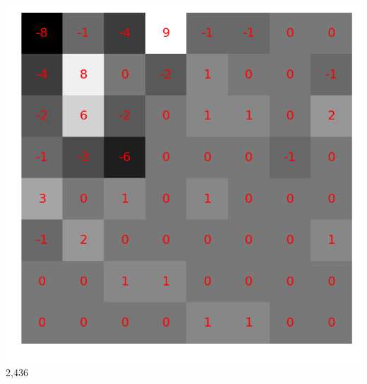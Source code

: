 \documentclass{beamer}
\begin{document}
\begin{frame}
\begin{minipage}[t]{0.42\linewidth}
\begin{center}
            \includegraphics[scale=0.2]{fig/8x8random_dct_entropy2.png}\\
            2,436
        \end{center}
    \end{minipage}
\end{frame}
\end{document}
